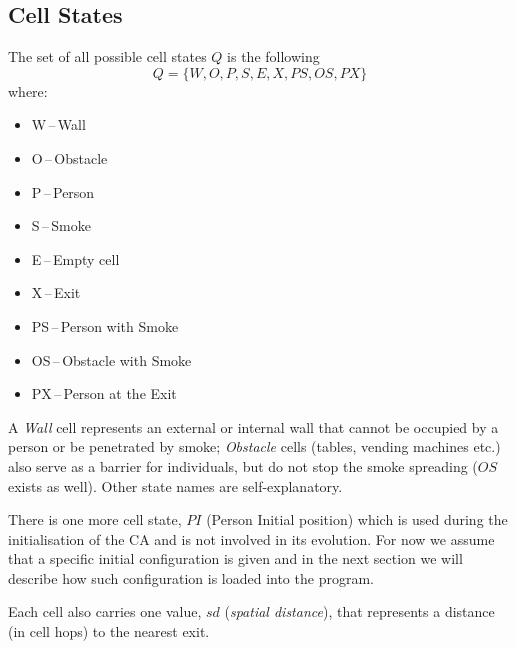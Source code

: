 \subsection{Cell States}
The set of all possible cell states $Q$ is the following
$$Q = \{W,O,P,S,E,X,PS,OS,PX\}$$ where:
\begin{itemize}
    \item W\,--\,Wall
    \item O\,--\,Obstacle
    \item P\,--\,Person
    \item S\,--\,Smoke
    \item E\,--\,Empty cell
    \item X\,--\,Exit
    \item PS\,--\,Person with Smoke
    \item OS\,--\,Obstacle with Smoke
    \item PX\,--\,Person at the Exit
\end{itemize}

A \emph{Wall} cell represents an external or internal wall that cannot be
occupied by a person or be penetrated by smoke; \emph{Obstacle} cells (tables,
vending machines etc.) also serve as a barrier for individuals, but do not stop
the smoke spreading ($OS$ exists as well).
Other state names are self-explanatory.

There is one more cell state, $PI$ (Person Initial position) which is used
during the initialisation of the CA and is not involved in its evolution.
For now we assume that a specific initial configuration is given and in the next 
section we will describe how such configuration is loaded into the program.

Each cell also carries one value, $sd$ (\emph{spatial distance}), that
represents a distance (in cell hops) to the nearest exit.

